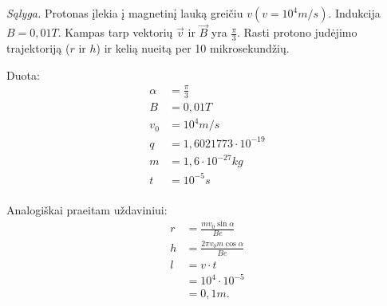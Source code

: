 \begin{exmp}
  \emph{Sąlyga.} Protonas įlekia į magnetinį lauką greičiu
  $v (v = 10^{4}m/s)$. Indukcija $B = 0,01 T$. Kampas tarp vektorių
  $\vec{v}$ ir $\vec{B}$ yra $\frac{\pi}{3}$. Rasti protono judėjimo
  trajektoriją ($r$ ir $h$) ir kelią nueitą per 10 mikrosekundžių.

  Duota:
  \begin{align*}
    \alpha &= \frac{\pi}{3} \\
    B &= 0,01 T \\
    v_{0} &= 10^{4} m/s \\
    q &= 1,6021773 \cdot 10^{-19} \\
    m &= 1,6 \cdot 10^{-27} kg \\
    t &= 10^{-5} s \\
  \end{align*}

  Analogiškai praeitam uždaviniui:
  \begin{align*}
    r &= \frac{m v_{0} \sin \alpha}{B e} \\
    h &= \frac{2 \pi v_{0} m \cos \alpha}{Be} \\
    l &= v \cdot t \\
      &= 10^{4} \cdot 10^{-5} \\
      &= 0,1 m.\\
  \end{align*}

\end{exmp}
